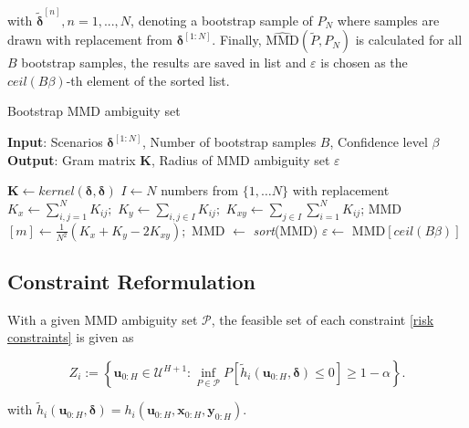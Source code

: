 with $\tilde{\boldsymbol{\delta}}^{[n]}, n = 1,...,N$, denoting a bootstrap sample of $P_N$ where samples are drawn with replacement from $\boldsymbol{\delta}^{[1:N]}$. Finally, $\widehat{\text{MMD}} (\tilde{P}, P_N)$ is calculated for all $B$ bootstrap samples, the results are saved in list and $\varepsilon$ is chosen as the $\textit{ceil}(B \beta)$-th element of the sorted list. 


\begin{algorithm}
	\caption{Bootstrap MMD ambiguity set}
	\label{alg:Bootstrap}
	\hspace*{\algorithmicindent} \textbf{Input}: Scenarios $ \boldsymbol{\delta}^{[1:N]} $, Number of bootstrap samples $B$, Confidence level $\beta$ \\
	\hspace*{\algorithmicindent} \textbf{Output}: Gram matrix $\boldsymbol{K}$, Radius of MMD ambiguity set $\varepsilon$
	\begin{algorithmic}[1]
		\State $\boldsymbol{K} \gets \textit{kernel}(\boldsymbol{\delta}, \boldsymbol{\delta})$
			\State $I \gets N$ numbers from $\{1, \dots N \}$ with replacement
			\State $K_x \gets \sum_{i,j = 1}^N K_{ij};$
			\State $K_y \gets \sum_{i,j \in I} K_{ij};$
			\State $K_{xy} \gets \sum_{j \in I} \sum_{i = 1}^N K_{ij}$;
			\State MMD$[m] \gets \frac{1}{N^2} \left( K_x + K_y - 2 K_{xy} \right) ;$
		\EndFor
		\State MMD $\gets$ \textit{sort}(MMD)
		\State $\varepsilon \gets$ MMD$\left[ \textit{ceil} (B \beta) \right]$
	\end{algorithmic}
\end{algorithm}

\subsection{Constraint Reformulation} \label{Constraint Reformulation}

With a given MMD ambiguity set $\mathcal{P}$, the feasible set of each constraint \ref{risk constraints} is given as

\begin{equation} \label{feasible set}
	Z_i :=  \left\{ \boldsymbol{u}_{0:H} \in \mathcal{U}^{H+1} : \inf\limits_{P \in \mathcal{P}}P \left[ \tilde{h}_i(\boldsymbol{u}_{0:H},  \boldsymbol{\delta}) \leq 0 \right] \geq 1 - \alpha \right\}.
\end{equation}

with $\tilde{h}_i(\boldsymbol{u}_{0:H},  \boldsymbol{\delta}) =  h_i(\boldsymbol{u}_{0:H},  \boldsymbol{x}_{0:H},  \boldsymbol{y}_{0:H})$.

